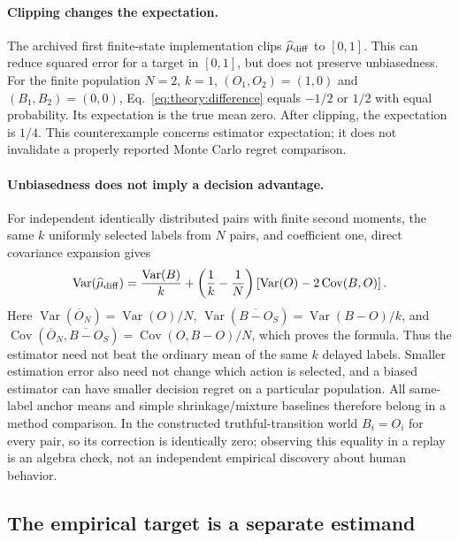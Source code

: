 \paragraph{Clipping changes the expectation.}
The archived first finite-state implementation clips
$\widehat\mu_{\rm diff}$ to $[0,1]$. This can reduce squared error for a
target in $[0,1]$, but does not preserve unbiasedness. For the finite
population $N=2$, $k=1$, $(O_1,O_2)=(1,0)$ and $(B_1,B_2)=(0,0)$,
Eq.~\eqref{eq:theory:difference} equals $-1/2$ or $1/2$ with equal
probability. Its expectation is the true mean zero. After clipping, the
expectation is $1/4$. This counterexample concerns estimator expectation;
it does not invalidate a properly reported Monte Carlo regret comparison.

\paragraph{Unbiasedness does not imply a decision advantage.}
For independent identically distributed pairs with finite second moments,
the same $k$ uniformly selected labels from $N$ pairs, and coefficient one,
direct covariance expansion gives
\begin{equation}
 \operatorname{Var}(\widehat\mu_{\rm diff})
 =\frac{\operatorname{Var}(B)}{k}
 +\left(\frac1k-\frac1N\right)
 \left[\operatorname{Var}(O)-2\operatorname{Cov}(B,O)\right].
\end{equation}
Here $\operatorname{Var}(\overline O_N)=\operatorname{Var}(O)/N$,
$\operatorname{Var}(\overline{B-O}_S)=\operatorname{Var}(B-O)/k$, and
$\operatorname{Cov}(\overline O_N,\overline{B-O}_S)
=\operatorname{Cov}(O,B-O)/N$, which proves the formula. Thus the estimator
need not beat the ordinary mean of the same $k$ delayed labels. Smaller
estimation error also need not change which action is selected, and a biased
estimator can have smaller decision regret on a particular population.
All same-label anchor means and simple shrinkage/mixture baselines therefore
belong in a method comparison. In the constructed truthful-transition world
$B_i=O_i$ for every pair, so its correction is identically zero; observing
this equality in a replay is an algebra check, not an independent empirical
discovery about human behavior.

\subsection{The empirical target is a separate estimand}
\label{app:theory:bridge}

